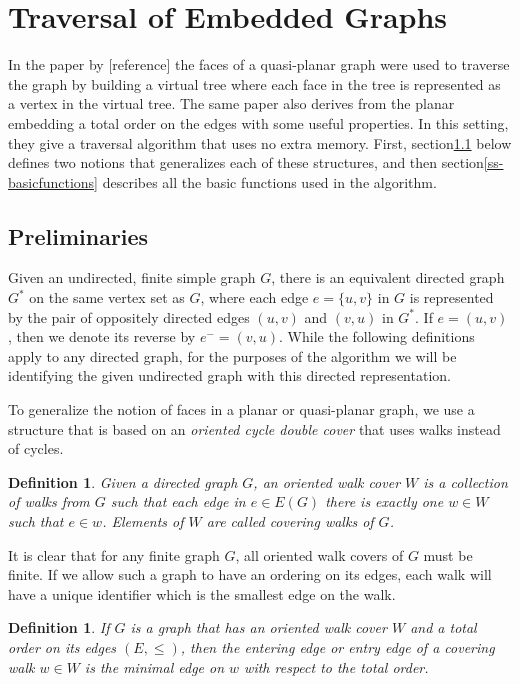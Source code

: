 \documentclass[11pt]{article}
\newtheorem{definition}[theorem]{Definition}
\begin{document}
\section{Traversal of Embedded Graphs}   %
\label{sec-embed}

In the paper by 
[reference] the faces of a quasi-planar graph were used to 
traverse the graph by building a virtual tree where each face 
in the tree is represented as a vertex in the virtual tree.  The same paper also derives from the planar embedding 
a total order on the edges with some useful properties.  In this setting, they give a traversal algorithm 
that uses no extra memory.  First, section\ref{ss-prelim} below defines two notions that generalizes each 
of these structures, and then section\ref{ss-basicfunctions} describes all the basic functions 
used in the algorithm.  

\subsection{Preliminaries}
\label{ss-prelim}

Given an undirected, finite simple graph $G$, there is an equivalent directed graph 
$G^*$ on the same vertex set as $G$, where each 
edge $e=\{u,v\}$ in $G$ is represented by the pair of oppositely directed edges $(u,v)$ and $(v,u)$ in $G^*$.  
If $e= (u,v)$, then we denote its reverse by $e^- = (v,u)$.  
While the following definitions apply to any directed graph, for the purposes of the algorithm we will be 
identifying the given undirected graph with this directed representation.  

To generalize the notion of faces in a planar or quasi-planar graph, we use a structure that is 
based on an \emph{oriented cycle double cover} that uses walks instead of cycles.

\begin{definition}
\label{def-ocw}
Given a directed graph $G$, an \emph{oriented walk cover} $W$ is a collection of walks from $G$ such that 
each edge in $e\in E(G)$ there is exactly one $w\in W$ such that $e\in w$.  Elements of $W$ are called 
\emph{covering walks} of $G$.
\end{definition} 

It is clear that for any finite graph $G$, all oriented walk covers of $G$ must 
be finite.   If we allow such a graph to have an ordering on its edges, each walk will 
have a unique identifier which is the smallest edge on the walk.

\begin{definition}
\label{def-entry}
If $G$ is a graph that has an oriented walk cover $W$ and a total order on its 
edges $(E,\le)$, then the \emph{entering edge} or \emph{entry edge} of a covering walk $w\in W$ is the minimal 
edge on $w$ with respect to the total order.  
\end{definition}
\end{document}
